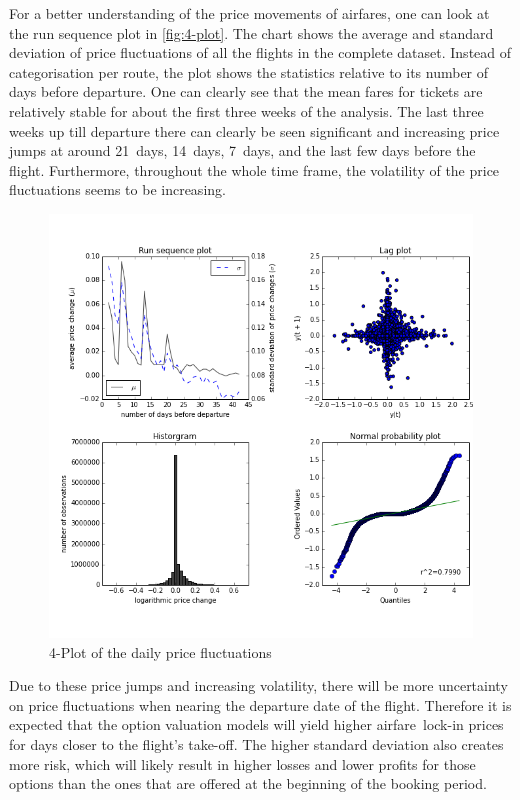 For a better understanding of the price movements of airfares, one can look at the run sequence plot in \autoref{fig:4-plot}. The chart shows the average and standard deviation of price fluctuations of all the flights in the complete dataset. Instead of categorisation per route, the plot shows the statistics relative to its number of days before departure. One can clearly see that the mean fares for tickets are relatively stable for about the first three weeks of the analysis. The last three weeks up till departure there can clearly be seen significant and increasing price jumps at around 21~days, 14~days, 7~days, and the last few days before the flight. Furthermore, throughout the whole time frame, the volatility of the price fluctuations seems to be increasing.


\begin{figure}
\centering
\includegraphics[width=.8\textwidth]{figures/4-plot}
\caption{4-Plot of the daily price fluctuations}
\label{fig:4-plot}
\end{figure}


Due to these price jumps and increasing volatility, there will be more uncertainty on price fluctuations when nearing the departure date of the flight. Therefore it is expected that the option valuation models will yield higher airfare~lock-in prices for days closer to the flight's take-off. The higher standard deviation also creates more risk, which will likely result in higher losses and lower profits for those options than the ones that are offered at the beginning of the booking period.

